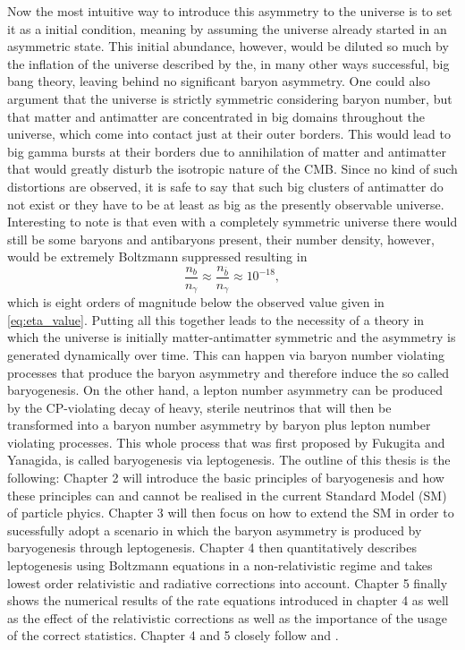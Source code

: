 Now the most intuitive way to introduce this asymmetry to the universe is to set it as a initial condition, meaning by assuming the universe already started in an asymmetric state. This initial abundance, however, would be diluted so much by the inflation of the universe described by the, in many other ways successful, big bang theory, leaving behind no significant baryon asymmetry. One could also argument that the universe is strictly symmetric considering baryon number, but that matter and antimatter are concentrated in big domains throughout the universe, which come into contact just at their outer borders. This would lead to big gamma bursts at their borders due to annihilation of matter and antimatter that would greatly disturb the isotropic nature of the CMB. Since no kind of such distortions are observed, it is safe to say that such big clusters of antimatter do not exist or they have to be at least as big as the presently observable universe\cite{Cline:2006ts}. Interesting to note is that even with a completely symmetric universe there would still be some baryons and antibaryons present, their number density, however, would be extremely Boltzmann suppressed resulting in\cite[Eq. (1.27)]{Biondini:2016hhn}
\begin{equation}
	\frac{n_b}{n_\gamma}\approx	\frac{n_{\bar{b}}}{n_\gamma}\approx10^{-18},
\end{equation}
which is eight orders of magnitude below the observed value given in \eqref{eq:eta_value}.\newline \indent
Putting all this together leads to the necessity of a theory in which the universe is initially matter-antimatter symmetric and the asymmetry is generated dynamically over time. This can happen via baryon number violating processes that produce the baryon asymmetry and therefore induce the so called baryogenesis. On the other hand, a lepton number asymmetry can be produced by the CP-violating decay of heavy, sterile neutrinos that will then be transformed into a baryon number asymmetry by baryon plus lepton number violating processes. This whole process that was first proposed by Fukugita and Yanagida\cite{Fukugita:1986hr}, is called baryogenesis via leptogenesis. \newline \indent
The outline of this thesis is the following: Chapter 2 will introduce the basic principles of baryogenesis and how these principles can and cannot be realised in the current Standard Model (SM) of particle phyics. Chapter 3 will then focus on how to extend the SM in order to sucessfully adopt a scenario in which the baryon asymmetry is produced by baryogenesis through leptogenesis. Chapter 4 then quantitatively describes leptogenesis using Boltzmann equations in a non-relativistic regime and takes lowest order relativistic and radiative corrections into account. Chapter 5 finally shows the numerical results of the rate equations introduced in chapter 4 as well as the effect of the relativistic %
corrections as well as the importance of the usage of the correct statistics. \newline\indent
Chapter 4 and 5 closely follow \cite{Bodeker:2013qaa} and \cite{Wormann:2016yyi}.